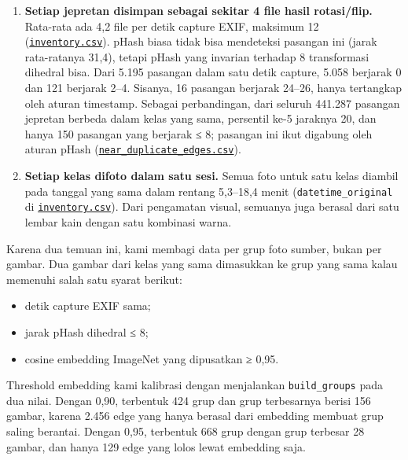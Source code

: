 \documentclass[10pt,a4paper]{article}
\providecommand{\tightlist}{\setlength{\itemsep}{2pt}\setlength{\parskip}{0pt}}
\begin{document}
\begin{enumerate}
\def\labelenumi{\arabic{enumi}.}
\tightlist
\item
  \textbf{Setiap jepretan disimpan sebagai sekitar 4 file hasil rotasi/flip.} Rata-rata ada 4,2 file per detik capture EXIF, maksimum 12 (\href{https://github.com/Universitas-Cakrawala/semarang-batik-fine-grained-transfer-learning/blob/main/data/manifests/inventory.csv}{\texttt{inventory.csv}}). pHash biasa tidak bisa mendeteksi pasangan ini (jarak rata-ratanya 31,4), tetapi pHash yang invarian terhadap 8 transformasi dihedral bisa. Dari 5.195 pasangan dalam satu detik capture, 5.058 berjarak 0 dan 121 berjarak 2--4. Sisanya, 16 pasangan berjarak 24--26, hanya tertangkap oleh aturan timestamp. Sebagai perbandingan, dari seluruh 441.287 pasangan jepretan berbeda dalam kelas yang sama, persentil ke-5 jaraknya 20, dan hanya 150 pasangan yang berjarak ≤ 8; pasangan ini ikut digabung oleh aturan pHash (\href{https://github.com/Universitas-Cakrawala/semarang-batik-fine-grained-transfer-learning/blob/main/data/manifests/near_duplicate_edges.csv}{\texttt{near\_\allowbreak{}duplicate\_\allowbreak{}edges.csv}}).
\item
  \textbf{Setiap kelas difoto dalam satu sesi.} Semua foto untuk satu kelas diambil pada tanggal yang sama dalam rentang 5,3--18,4 menit (\texttt{datetime\_\allowbreak{}original} di \href{https://github.com/Universitas-Cakrawala/semarang-batik-fine-grained-transfer-learning/blob/main/data/manifests/inventory.csv}{\texttt{inventory.csv}}). Dari pengamatan visual, semuanya juga berasal dari satu lembar kain dengan satu kombinasi warna.
\end{enumerate}

Karena dua temuan ini, kami membagi data per grup foto sumber, bukan per gambar. Dua gambar dari kelas yang sama dimasukkan ke grup yang sama kalau memenuhi salah satu syarat berikut:

\begin{itemize}
\tightlist
\item
  detik capture EXIF sama;
\item
  jarak pHash dihedral ≤ 8;
\item
  cosine embedding ImageNet yang dipusatkan ≥ 0,95.
\end{itemize}

Threshold embedding kami kalibrasi dengan menjalankan \texttt{build\_\allowbreak{}groups} pada dua nilai. Dengan 0,90, terbentuk 424 grup dan grup terbesarnya berisi 156 gambar, karena 2.456 edge yang hanya berasal dari embedding membuat grup saling berantai. Dengan 0,95, terbentuk 668 grup dengan grup terbesar 28 gambar, dan hanya 129 edge yang lolos lewat embedding saja.
\end{document}
